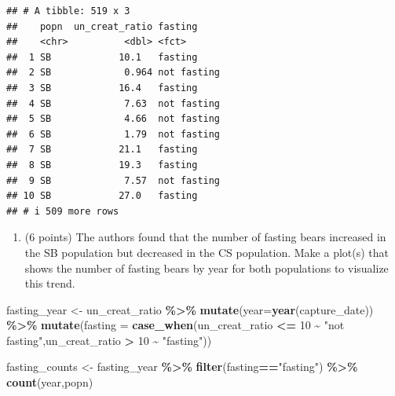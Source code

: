 \documentclass[
]{article}
\newenvironment{Shaded}{\begin{snugshade}}{\end{snugshade}}
\newcommand{\AttributeTok}[1]{\textcolor[rgb]{0.13,0.29,0.53}{#1}}
\newcommand{\DecValTok}[1]{\textcolor[rgb]{0.00,0.00,0.81}{#1}}
\newcommand{\FunctionTok}[1]{\textcolor[rgb]{0.13,0.29,0.53}{\textbf{#1}}}
\newcommand{\NormalTok}[1]{#1}
\newcommand{\OtherTok}[1]{\textcolor[rgb]{0.56,0.35,0.01}{#1}}
\newcommand{\SpecialCharTok}[1]{\textcolor[rgb]{0.81,0.36,0.00}{\textbf{#1}}}
\newcommand{\StringTok}[1]{\textcolor[rgb]{0.31,0.60,0.02}{#1}}
\providecommand{\tightlist}{%
  \setlength{\itemsep}{0pt}\setlength{\parskip}{0pt}}
\begin{document}
\begin{verbatim}
## # A tibble: 519 x 3
##    popn  un_creat_ratio fasting    
##    <chr>          <dbl> <fct>      
##  1 SB            10.1   fasting    
##  2 SB             0.964 not fasting
##  3 SB            16.4   fasting    
##  4 SB             7.63  not fasting
##  5 SB             4.66  not fasting
##  6 SB             1.79  not fasting
##  7 SB            21.1   fasting    
##  8 SB            19.3   fasting    
##  9 SB             7.57  not fasting
## 10 SB            27.0   fasting    
## # i 509 more rows
\end{verbatim}

\begin{enumerate}
\def\labelenumi{\arabic{enumi}.}
\setcounter{enumi}{7}
\tightlist
\item
  (6 points) The authors found that the number of fasting bears
  increased in the SB population but decreased in the CS population.
  Make a plot(s) that shows the number of fasting bears by year for both
  populations to visualize this trend.
\end{enumerate}

\begin{Shaded}
\begin{Highlighting}[]
\NormalTok{fasting\_year }\OtherTok{\textless{}{-}}\NormalTok{ un\_creat\_ratio }\SpecialCharTok{\%\textgreater{}\%}
  \FunctionTok{mutate}\NormalTok{(}\AttributeTok{year=}\FunctionTok{year}\NormalTok{(capture\_date)) }\SpecialCharTok{\%\textgreater{}\%}
  \FunctionTok{mutate}\NormalTok{(}\AttributeTok{fasting =} \FunctionTok{case\_when}\NormalTok{(un\_creat\_ratio }\SpecialCharTok{\textless{}=} \DecValTok{10} \SpecialCharTok{\textasciitilde{}} \StringTok{"not fasting"}\NormalTok{,un\_creat\_ratio }\SpecialCharTok{\textgreater{}} \DecValTok{10} \SpecialCharTok{\textasciitilde{}} \StringTok{"fasting"}\NormalTok{))}
\end{Highlighting}
\end{Shaded}

\begin{Shaded}
\begin{Highlighting}[]
\NormalTok{fasting\_counts }\OtherTok{\textless{}{-}}\NormalTok{ fasting\_year }\SpecialCharTok{\%\textgreater{}\%}
  \FunctionTok{filter}\NormalTok{(fasting}\SpecialCharTok{==}\StringTok{"fasting"}\NormalTok{) }\SpecialCharTok{\%\textgreater{}\%}
  \FunctionTok{count}\NormalTok{(year,popn)}
\end{Highlighting}
\end{Shaded}
\end{document}
